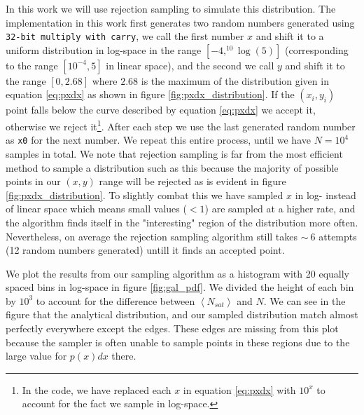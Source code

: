 In this work we will use rejection sampling to simulate this distribution. The implementation in this work first generates two random numbers generated using \texttt{32-bit multiply with carry}, we call the first number $x$ and shift it to a uniform distribution in log-space in the range $\left[-4, ^{10}\log(5)\right]$ (corresponding to the range $\left[10^{-4}, 5\right]$ in linear space), and the second we call $y$ and shift it to the range $\left[0, 2.68\right]$ where $2.68$ is the maximum of the distribution given in equation \ref{eq:pxdx} as shown in figure \ref{fig:pxdx_distribution}. If the $\left(x_i, y_i\right)$ point falls below the curve described by equation \ref{eq:pxdx} we accept it, otherwise we reject it\footnote{In the code, we have replaced each $x$ in equation \ref{eq:pxdx} with $10^x$ to account for the fact we sample in log-space.}. After each step we use the last generated random number as \texttt{x0} for the next number. We repeat this entire process, until we have $N = 10^4$ samples in total. We note that rejection sampling is far from the most efficient method to sample a distribution such as this because the majority of possible points in our $\left(x, y\right)$ range will be rejected as is evident in figure \ref{fig:pxdx_distribution}. To slightly combat this we have sampled $x$ in log- instead of linear space which means small values ($<1$) are sampled at a higher rate, and the algorithm finds itself in the "interesting" region of the distribution more often. Nevertheless, on average the rejection sampling algorithm still takes $\sim~6$ attempts (12 random numbers generated) untill it finds an accepted point.

We plot the results from our sampling algorithm as a histogram with 20 equally spaced bins in log-space in figure \ref{fig:gal_pdf}. We divided the height of each bin by $10^3$ to account for the difference between $\left<N_{sat}\right>$ and $N$. We can see in the figure that the analytical distribution, and our sampled distribution match almost perfectly everywhere except the edges. These edges are missing from this plot because the sampler is often unable to sample points in these regions due to the large value for $p(x)dx$ there. 

